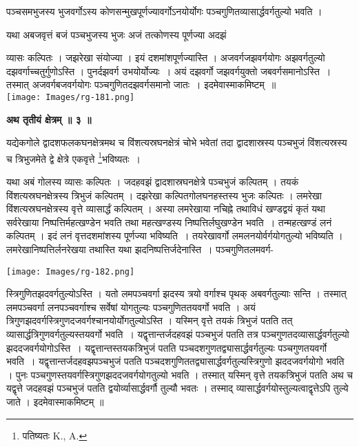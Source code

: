 \documentclass[11pt, openany]{book}
\begin{document}
{\ab पञ्चसमभुजस्य भुजवर्गोऽस्य कोणसन्मुखपूर्णज्यावर्गोऽनयोर्योगः पञ्चगुणितव्यासार्द्धवर्गतुल्यो भवति । }

\newpage

यथा अबजवृत्तं बजं पञ्चभुजस्य भुजः अजं तत्कोणस्य पूर्णज्या अदझं 

\begin{vwcol}[widths={0.65,0.35}, sep=.8cm, rule=0pt]
व्यासः कल्पितः । जझरेखा संयोज्या । इयं दशमांशपूर्णज्यास्ति । अजवर्गजझवर्गयोगः अझवर्गतुल्यो दझवर्गाच्चतुर्गुणोऽस्ति । पुनर्दझवर्ग उभयोर्योज्यः~।
अयं दझवर्गो जझवर्गयुक्तो जबवर्गसमानोऽस्ति~। तस्मात् अजवर्गबजवर्गयोगः पञ्चगुणितदझवर्गसमानो जातः~। इदमेवास्माकमिष्टम्~॥ \\
\noindent \texttt{[image: Images/rg-181.png]}  
\end{vwcol}

\begin{center}
\textbf{\large अथ तृतीयं क्षेत्रम् ॥ ३ ॥ }
\end{center}
\vspace{5mm}

{\ab यद्येकगोले द्वादशफलकघनक्षेत्रमथ च विंशत्यस्रघनक्षेत्रं चोभे भवेतां तदा द्वादशास्रस्य पञ्चभुजं विंशत्यस्रस्य च त्रिभुजमेते द्वे क्षेत्रे एकवृत्ते \renewcommand{\thefootnote}{१}\footnote{पतिष्यतः {\en K., A.}}भविष्यतः~। }\\
\vspace{3mm}

यथा अबं गोलस्य व्यासः कल्पितः । जदहवझं द्वादशास्रघनक्षेत्रे पञ्चभुजं कल्पितम् । तयकं विंशत्यस्रघनक्षेत्रस्य त्रिभुजं कल्पितम् । दझरेखा कल्पितगोलघनहस्तस्य भुजः कल्पितः । लमरेखा विंशत्यस्रघनक्षेत्रस्य वृत्ते व्यासार्द्धं कल्पितम् । अस्या लमरेखाया नचिह्ने तथाविधं खण्डद्वयं कृतं यथा सर्वरेखाया निष्पत्तिर्महत्खण्डेन भवति तथा महत्खण्डस्य निष्पत्तिर्लघुखण्डेन भवति~। तन्महत्खण्डं लनं कल्पितम् । इदं लनं वृत्तदशमांशस्य पूर्णज्या भविष्यति~। तयरेखावर्गो लमलनयोर्वर्गयोगतुल्यो भविष्यति । लमरेखानिष्पत्तिर्लनरेखया तथास्ति यथा झदनिष्पत्तिर्जदेनास्ति~। पञ्चगुणितलमवर्ग-

\newpage
\begin{center}
\texttt{[image: Images/rg-182.png]}  
\end{center}
\vspace{5mm}

\noindent स्त्रिगुणितझदवर्गतुल्योऽस्ति । यतो लमपञ्चवर्गा झदस्य त्रयो वर्गाश्च पृथक् अबवर्गतुल्याः सन्ति । तस्मात् लमपञ्चवर्गा लनपञ्चवर्गाश्च सर्वेषां योगतुल्यः पञ्चगुणिततयवर्गो भवति । अयं त्रिगुणझदवर्गस्त्रिगुणदजवर्गश्चानयोर्योगतुल्योऽस्ति । यस्मिन् वृत्ते तयकं त्रिभुजं पतति तत् व्यासार्द्धत्रिगुणवर्गतुल्यस्तयवर्गो भवति~। यद्वृत्तान्तर्जदहवझं पञ्चभुजं पतति तत्र पञ्चगुणतदव्यासार्द्धवर्गतुल्यो झददजवर्गयोगोऽस्ति~। यद्वृत्तान्तस्तयकत्रिभुजं पतति पञ्चदशगुणतद्व्यासार्द्धवर्गतुल्यः पञ्चगुणतयवर्गो भवति~। यद्वृत्तान्तर्जदहवझपञ्चभुजं पतति पञ्चदशगुणिततद्व्यासार्द्धवर्गतुल्यस्त्रिगुणो झददजवर्गयोगो भवति । पुनः पञ्चगुणस्तयवर्गस्त्रिगुणझददजवर्गयोगतुल्यो भवति । तस्मात् यस्मिन् वृत्ते तयकत्रिभुजं पतति अथ च यद्वृत्ते जदहवझं पञ्चभुजं पतति द्वयोर्व्यासार्द्धवर्गौ तुल्यौ भवतः । तस्माद् व्यासार्द्धवर्गयोस्तुल्यत्वाद्वृत्तेऽपि तुल्ये जाते । इदमेवास्माकमिष्टम् ॥\\
\vspace{3mm}
\end{document}

